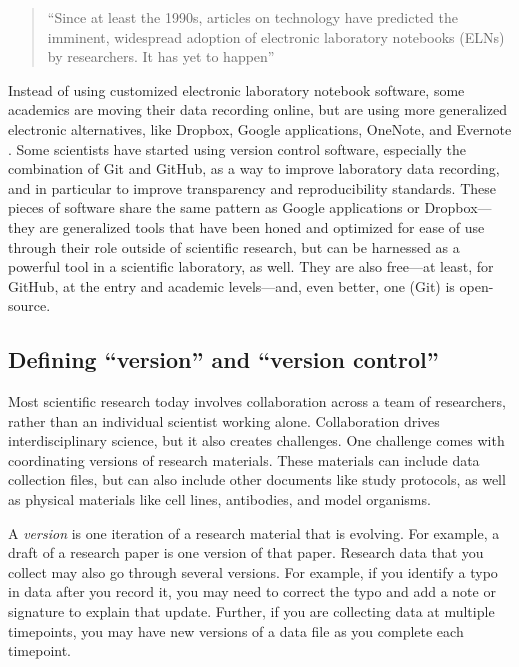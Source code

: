 \documentclass[]{tufte-book}
\begin{document}
\begin{quote}
``Since at least the 1990s, articles on technology have predicted the imminent,
widespread adoption of electronic laboratory notebooks (ELNs) by researchers. It has
yet to happen'' \citep{kwok2018lab}
\end{quote}

Instead of using customized electronic laboratory notebook software, some
academics are moving their data recording online, but are using more generalized
electronic alternatives, like Dropbox, Google applications, OneNote, and
Evernote \citep{perkel2011coding, kwok2018lab, giles2012digital, powell2012lab}.
Some scientists have started using version control software, especially the
combination of Git and GitHub, as a way to improve laboratory data recording,
and in particular to improve transparency and reproducibility standards.
These pieces of software share the same pattern as Google applications or
Dropbox---they are generalized tools that have been honed and optimized for ease
of use through their role outside of scientific research, but can be harnessed
as a powerful tool in a scientific laboratory, as well. They are also free---at
least, for GitHub, at the entry and academic levels---and, even better, one
(Git) is open-source.

\subsection{Defining ``version'' and ``version control''}\label{defining-version-and-version-control}

Most scientific research today involves collaboration across a team of
researchers, rather than an individual scientist working alone. Collaboration
drives interdisciplinary science, but it also creates challenges. One
challenge comes with coordinating versions of research materials. These
materials can include data collection files, but can also include other
documents like study protocols, as well as physical materials like cell lines,
antibodies, and model organisms.

A \emph{version} is one iteration of a research material that is evolving. For
example, a draft of a research paper is one version of that paper. Research data
that you collect may also go through several versions. For example, if you
identify a typo in data after you record it, you may need to correct the typo
and add a note or signature to explain that update. Further, if you are
collecting data at multiple timepoints, you may have new versions of a data file
as you complete each timepoint.
\end{document}
